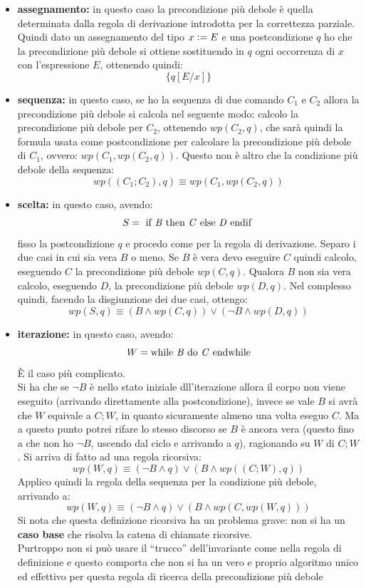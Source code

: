 \documentclass[a4paper,12pt, oneside]{book}
\def\cceq{\mathrel{\vcenter{\hbox{:}}{=}}}
\begin{document}
\begin{itemize}
  \item \textbf{assegnamento:} in questo caso la precondizione più debole è
  quella determinata dalla regola di derivazione introdotta per la correttezza
  parziale. Quindi dato un assegnamento del tipo $x\cceq E$ e una postcondizione
  $q$ ho che la precondizione più debole si ottiene sostituendo in $q$ ogni
  occorrenza di $x$ con l'espressione $E$, ottenendo quindi:
  \[\{q[E/x]\}\]
  \item \textbf{sequenza:} in questo caso, se ho la sequenza di due comando
  $C_1$ e $C_2$ allora la precondizione più debole si calcola nel seguente modo:
  calcolo la precondizione più debole per $C_2$, ottenendo $wp(C_2,q)$, che sarà
  quindi la formula usata come postcondizione per calcolare la precondizione più
  debole di $C_1$, ovvero: $wp(C_1,wp(C_2,q))$. Questo non è altro che la
  condizione più debole della sequenza:
  \[wp((C_1;C_2),q)\equiv wp(C_1,wp(C_2,q))\]
  \item \textbf{scelta:} in questo caso, avendo:
  \[S=\mbox{ if \textit{B} then \textit{C} else \textit{D} endif }\]
  fisso la postcondizione $q$ e procedo come per la regola di
  derivazione. Separo i due casi in cui sia vera $B$ o meno. Se $B$ è vera devo
  eseguire $C$ quindi calcolo, eseguendo $C$ la precondizione più debole
  $wp(C,q)$. Qualora $B$ non sia vera calcolo, eseguendo $D$, la precondizione
  più debole $wp(D,q)$. Nel complesso quindi, facendo la disgiunzione dei due
  casi, ottengo: 
  \[wp(S,q)\equiv(B\land wp(C,q))\lor (\neg B\land wp(D,q))\]
  \item \textbf{iterazione:} in questo caso, avendo:
  \[W=\mbox{while \textit{B} do \textit{C} endwhile}\]
  È il caso più complicato.\\
  Si ha che se $\neg B$ è nello stato iniziale dll'iterazione allora il corpo
  non viene eseguito (arrivando direttamente alla postcondizione), invece se
  vale $B$ si avrà che $W$ equivale a $C;W$, in 
  quanto sicuramente almeno una volta eseguo $C$. Ma a questo punto potrei
  rifare lo stesso discorso se $B$ è ancora vera (questo fino a che non ho $\neg
  B$, uscendo dal ciclo e arrivando a $q$), ragionando su $W$ di $C;W$. Si
  arriva di fatto ad una regola ricorsiva:
  \[wp(W,q)\equiv(\neg B\land q)\lor(B\land wp((C;W),q))\]
  Applico quindi la regola della sequenza per la condizione più debole,
  arrivando a:
  \[wp(W,q)\equiv(\neg B\land q)\lor(B\land wp(C, wp(W,q)))\]
  Si nota che questa definizione ricorsiva ha un problema grave: non si ha un
  \textbf{caso base} che risolva la catena di chiamate ricorsive.\\
  Purtroppo non si può usare il ``trucco'' dell'invariante come nella regola di
  definizione e questo comporta che non si ha un vero e proprio algoritmo unico
  ed effettivo per questa regola di ricerca della precondizione più debole
\end{itemize}
\end{document}
